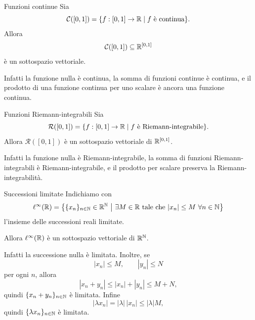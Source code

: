 \documentclass[a4paper]{article}
\begin{document}
\begin{snippetexample}{Funzioni continue}
    Sia
    \[
        \mathcal{C}([0,1])
        =
        \{f:[0,1]\to\mathbb{R}\mid f \text{ è continua}\}.
    \]
    Allora
    \[
        \mathcal{C}([0,1])\subseteq \mathbb{R}^{[0,1]}
    \]
    è un sottospazio vettoriale.

    Infatti la funzione nulla è continua, la somma di funzioni continue è continua, e il prodotto di una funzione continua per uno scalare è ancora una funzione continua.
\end{snippetexample}

\begin{snippetexample}{Funzioni Riemann-integrabili}
    Sia
    \[
        \mathcal{R}([0,1])
        =
        \{f:[0,1]\to\mathbb{R}\mid f \text{ è Riemann-integrabile}\}.
    \]
    Allora \(\mathcal{R}([0,1])\) è un sottospazio vettoriale di \(\mathbb{R}^{[0,1]}\).

    Infatti la funzione nulla è Riemann-integrabile, la somma di funzioni Riemann-integrabili è Riemann-integrabile, e il prodotto per scalare preserva la Riemann-integrabilità.
\end{snippetexample}

\begin{snippetexample}{Successioni limitate}
    Indichiamo con
    \[
        \ell^\infty(\realnumbers)
        =
        \left\{
            \{x_n\}_{n\in\naturalnumbers}\in\realnumbers^\naturalnumbers
            \ \middle|\
            \exists M\in\realnumbers \text{ tale che } |x_n|\leq M\ \forall n\in\naturalnumbers
        \right\}
    \]
    l'insieme delle successioni reali limitate.

    Allora \(\ell^\infty(\mathbb{R})\) è un sottospazio vettoriale di \(\mathbb{R}^{\mathbb{N}}\).

    Infatti la successione nulla è limitata. Inoltre, se
    \[
        |x_n|\leq M,
        \qquad
        |y_n|\leq N
    \]
    per ogni \(n\), allora
    \[
        |x_n+y_n|
        \leq
        |x_n|+|y_n|
        \leq
        M+N,
    \]
    quindi \(\{x_n+y_n\}_{n\in\mathbb{N}}\) è limitata. Infine
    \[
        |\lambda x_n|
        =
        |\lambda|\,|x_n|
        \leq
        |\lambda|M,
    \]
    quindi \(\{\lambda x_n\}_{n\in\mathbb{N}}\) è limitata.
\end{snippetexample}
\end{document}
